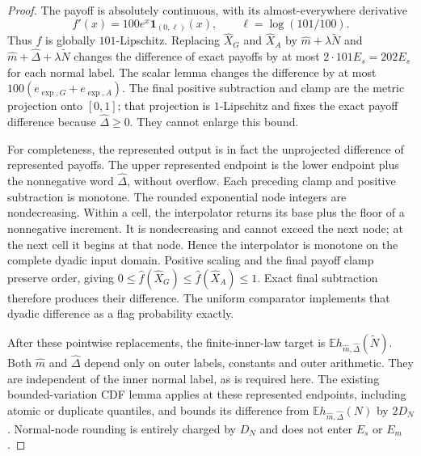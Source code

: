 \documentclass[11pt]{article}
\begin{document}
\begin{proof}
The payoff is absolutely continuous, with its almost-everywhere derivative
\begin{equation}
 f'(x)=100e^x\mathbf1_{(0,\ell)}(x),
 \qquad \ell=\log(101/100).
\end{equation}
Thus $f$ is globally $101$-Lipschitz. Replacing
$\widehat X_G$ and $\widehat X_A$ by
$\widehat m+\lambda\widetilde N$ and
$\widehat m+\widehat\Delta+\lambda\widetilde N$ changes the difference
of exact payoffs by at most $2\cdot101E_s=202E_s$ for each normal label.
The scalar lemma changes the difference by at most
$100(e_{\exp,G}+e_{\exp,A})$. The final positive subtraction and clamp
are the metric projection onto $[0,1]$; that projection is $1$-Lipschitz
and fixes the exact payoff difference because
$\widehat\Delta\geq0$. They cannot enlarge this bound.

For completeness, the represented output is in fact the unprojected
difference of represented payoffs. The upper represented endpoint is
the lower endpoint plus the nonnegative word $\widehat\Delta$, without
overflow. Each preceding clamp and positive subtraction is monotone.
The rounded exponential node integers are nondecreasing. Within a cell,
the interpolator returns its base plus the floor of a nonnegative
increment. It is nondecreasing and cannot exceed the next node; at the
next cell it begins at that node. Hence the interpolator is monotone on
the complete dyadic input domain. Positive scaling and the final payoff
clamp preserve order, giving $0\leq\widehat f(\widehat X_G)
\leq\widehat f(\widehat X_A)\leq1$. Exact final subtraction therefore
produces their difference. The uniform comparator implements that
dyadic difference as a flag probability exactly.

After these pointwise replacements, the finite-inner-law target is
$\mathbb E h_{\widehat m,\widehat\Delta}(\widetilde N)$.
Both $\widehat m$ and $\widehat\Delta$ depend only on outer labels,
constants and outer arithmetic. They are independent of the inner normal
label, as is required here. The existing bounded-variation CDF lemma
applies at these represented endpoints, including atomic or duplicate
quantiles, and bounds its difference from
$\mathbb E h_{\widehat m,\widehat\Delta}(N)$ by $2D_N$.
Normal-node rounding is entirely charged by $D_N$ and does not enter
$E_s$ or $E_m$.


\end{proof}
\end{document}
